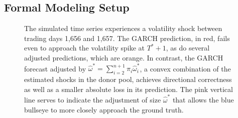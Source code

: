 \documentclass[11pt]{article}
\theoremstyle{definition}
\begin{document}
\subsection{Formal Modeling Setup}

  \begin{figure}[h!]
    \begin{center}
      \caption{The simulated time series experiences a volatility shock between trading days 1,656 and 1,657.  The GARCH prediction, in red, fails even to approach the volatility spike at $T^{*}+1$, as do several adjusted predictions, which are orange.  In contrast, the GARCH forecast adjusted by $\hat\omega^{*} = \sum^{n+1}_{i=2}\pi_{i}\hat\omega^{*}_{i} $, a convex combination of the estimated shocks in the donor pool, achieves directional correctness as well as a smaller absolute loss in its prediction.  The pink vertical line serves to indicate the adjustment of size $\hat\omega^{*}$ that allows the blue bullseye to more closely approach the ground truth.}    \label{fig:motivating_piece_convex_combination}
   
      \end{center}
    \end{figure}
\end{document}
